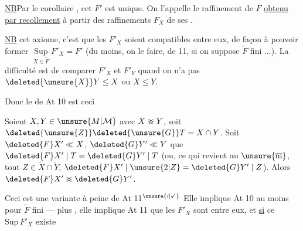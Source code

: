 \uline{NB}\quad Par le corollaire , cet $F'$ est
unique. On l'appelle le raffinement de $F$
\uline{obtenu par recollement} à partir des raffinements
$F_X$ de ses .

\uline{NB}\quad {}
cet axiome, c'est que les $F'_X$ soient
compatibles entre eux, de façon à pouvoir
former $\mathop{\mathrm{Sup}}\limits_{X\in\widetilde F}F'_X=F'$ (du moins, on  le
faire,  de  11, si on suppose
$\widetilde F$ fini ...). La difficulté est de comparer
$F'_X$ et $F'_Y$ quand on n'a pas $\deleted{\unsure{X}}Y\leq X$ ou $X\leq Y$.

Donc le  de At 10 est ceci

\noindent\llap{\smash{\rule[-5.1\baselineskip]{0.4pt}{5.2\baselineskip}}\enspace}\uline{ }\quad Soient $X,Y\in\unsure{M|\mathcal{M}}$ avec $X\mathrel{\rlap{$<$}{>}}Y$, soit
 $\deleted{\unsure{Z}}\deleted{\unsure{G}}T=X\cap Y$. Soit $\deleted{F}X'\ll X$, $\deleted{G}Y'\ll Y$
 que $\deleted{F}X'\mid T=\deleted{G}Y'\mid T$ (ou, ce qui
revient au $\unsure{\overline{\mathrm m}}$,  tout $Z\in\widetilde X\cap\widetilde Y$,
$\deleted{F}X'\mid\unsure{2|Z}=\deleted{G}Y'\mid Z$). Alors $\deleted{F}X'\mathrel{\rlap{$<$}{>}}\deleted{G}Y'$.

Ceci est une variante à peine
 de At 11$^{\unsure{\prime|\checkmark}}$ Elle implique At 10
au moins pour $\widetilde F$ fini --- plus ,
elle implique  At 11 que les $F'_X$ sont
 entre eux, et \uline{si} ce $\mathrm{Sup}\,F'_X$ existe
